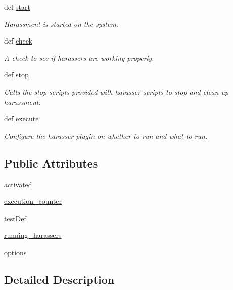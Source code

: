 \begin{DoxyCompactItemize}
def \hyperlink{class_harasser_1_1_harasser_aed32fb178974a05a4f4be00957599c67}{start}
\begin{DoxyCompactList}\small\item\em Harassment is started on the system. \end{DoxyCompactList}\item 
def \hyperlink{class_harasser_1_1_harasser_ab5ea4c244f800d83bcffabca0c2f0177}{check}
\begin{DoxyCompactList}\small\item\em A check to see if harassers are working properly. \end{DoxyCompactList}\item 
def \hyperlink{class_harasser_1_1_harasser_aad6ad8458a1afbb7ca4859f6d8b9d803}{stop}
\begin{DoxyCompactList}\small\item\em Calls the stop-\/scripts provided with harasser scripts to stop and clean up harassment. \end{DoxyCompactList}\item 
def \hyperlink{class_harasser_1_1_harasser_a5e76810f26871d800420089480269fb9}{execute}
\begin{DoxyCompactList}\small\item\em Configure the harasser plugin on whether to run and what to run. \end{DoxyCompactList}\end{DoxyCompactItemize}
\subsection*{Public Attributes}
\begin{DoxyCompactItemize}
\item 
\hyperlink{class_harasser_1_1_harasser_af1ed57b62f3b8cf35af5bb750c18afe4}{activated}
\item 
\hyperlink{class_harasser_1_1_harasser_a96c7c91ef5d33784056c567ba49a2c8a}{execution\-\_\-counter}
\item 
\hyperlink{class_harasser_1_1_harasser_adddf34aabbc91934437e1a30134224c3}{test\-Def}
\item 
\hyperlink{class_harasser_1_1_harasser_ad9d37d39c99222e899af613a573ecd15}{running\-\_\-harassers}
\item 
\hyperlink{class_harasser_1_1_harasser_ab9ed73d71cdaae7d9b5cc81548823527}{options}
\end{DoxyCompactItemize}


\subsection{Detailed Description}


